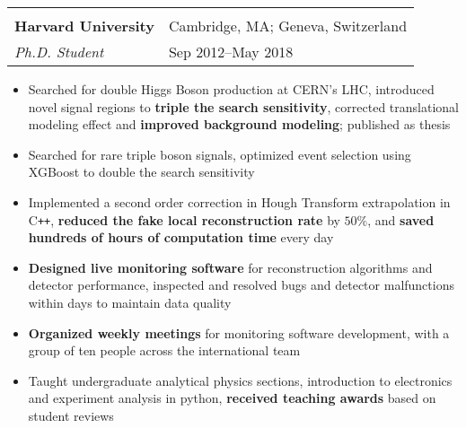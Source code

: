 \documentclass[letterpaper,11pt,oneside]{article}
\begin{document}
 \begin{flushleft}
 \vspace{-0.35cm}
 \begin{tabular}{@{} l l }
    \hspace{0.6\linewidth} & \hspace{0.25\linewidth} \\
    \textbf{Harvard University} & \hspace{0.01\linewidth} Cambridge, MA; Geneva, Switzerland \\ 
    \textit{Ph.D. Student} & \hspace{0.175\linewidth} Sep 2012--May 2018 \\ 
 \end{tabular}
 \end{flushleft}
 \begin{flushleft}
  \begin{small}
 \begin{itemize}[leftmargin=*]
  \item Searched for double Higgs Boson production at CERN's LHC, introduced novel signal regions to \textbf{triple the search sensitivity}, corrected translational modeling effect and \textbf{improved background modeling}; published as thesis
  \item Searched for rare triple boson signals, optimized event selection using XGBoost to double the search sensitivity
  \item Implemented a second order correction in Hough Transform extrapolation in C\texttt{++}, \textbf{reduced the fake local reconstruction rate} by $50\%$, and \textbf{saved hundreds of hours of computation time} every day
   \item\textbf{Designed live monitoring software} for reconstruction algorithms and detector performance, inspected and resolved bugs and detector malfunctions within days to maintain data quality
  \item \textbf{Organized weekly meetings} for monitoring software development, with a group of ten people across the international team
  \item Taught undergraduate analytical physics sections, introduction to electronics and experiment analysis in python, \textbf{received teaching awards} based on student reviews
 \end{itemize}
  \end{small}
 \end{flushleft}
\end{document}

